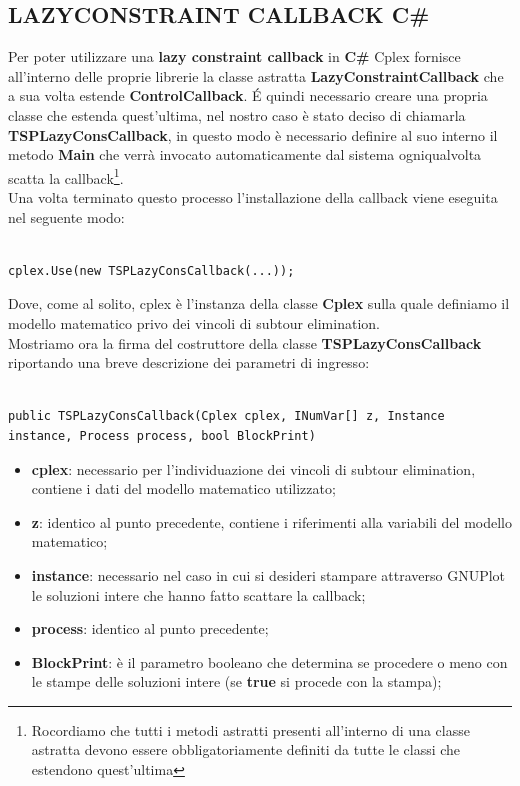 \documentclass[11pt]{article}
\begin{document}
\subsection*{LAZYCONSTRAINT CALLBACK C\#}

Per poter utilizzare una \textbf{lazy constraint callback} in \textbf{C\#} Cplex fornisce all'interno delle proprie librerie la classe astratta \textbf{LazyConstraintCallback} che a sua volta estende \textbf{ControlCallback}. \'E quindi necessario creare una propria classe che estenda quest'ultima, nel nostro caso è stato deciso di chiamarla \textbf{TSPLazyConsCallback}, in questo modo è necessario definire al suo interno il metodo \textbf{Main} che verrà invocato automaticamente dal sistema ogniqualvolta scatta la callback\footnote{Rocordiamo che tutti i metodi astratti presenti all'interno di una classe astratta devono essere obbligatoriamente definiti da tutte le classi che estendono quest'ultima}.\\
Una volta terminato questo processo l'installazione della callback viene eseguita nel seguente modo:

\begin{lstlisting}

cplex.Use(new TSPLazyConsCallback(...));

\end{lstlisting}

Dove, come al solito, cplex è l'instanza della classe \textbf{Cplex} sulla quale definiamo il modello matematico privo dei vincoli di subtour elimination.\\
Mostriamo ora la firma del costruttore della classe \textbf{TSPLazyConsCallback} riportando una breve descrizione dei parametri di ingresso:

\begin{lstlisting}

public TSPLazyConsCallback(Cplex cplex, INumVar[] z, Instance instance, Process process, bool BlockPrint)

\end{lstlisting}

\begin{itemize}
    \item \textbf{cplex}: necessario per l'individuazione dei vincoli di subtour elimination, contiene i dati del modello matematico utilizzato;
    \item \textbf{z}: identico al punto precedente, contiene i riferimenti alla variabili del modello matematico;
    \item \textbf{instance}: necessario nel caso in cui si desideri stampare attraverso GNUPlot le soluzioni intere che hanno fatto scattare la callback;
    \item \textbf{process}: identico al punto precedente;
    \item \textbf{BlockPrint}: è il parametro booleano che determina se procedere o meno con le stampe delle soluzioni intere (se \textbf{true} si procede con la stampa);
\end{itemize}
\end{document}
